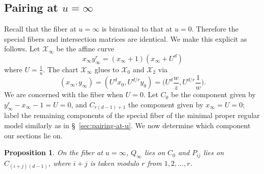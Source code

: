\documentclass[reqno]{amsart}
\newtheorem{proposition}[thm]{Proposition}
\theoremstyle{definition}
\theoremstyle{remark}
\def\XX{\mathcal{X}}
\newcommand{\sxi}{\mathcal{X}_\infty}
\begin{document}


\subsection{Pairing at $u=\infty$}
\label{sec:pairing-at-u=infty}

Recall that the fiber at $u=\infty$ is birational to that at $u=0$. Therefore the special fibers and intersection matrices are identical. We make this explicit as follows. Let $\sxi$ be the affine curve
  \[
  x_\infty y_\infty^r = (x_\infty + 1)(x_\infty + {U^d})
  \]
  where $U = \frac{1}{u}$. The chart $\sxi$ glues to $\XX_0$ and $\XX_2$ via 
  \[
  (x_\infty, y_\infty) = (U^d x_0, U^{d/r} y_0) = \bigg(U^d \frac{w}{z}, U^{d/r} \frac{1}{w}\bigg).
  \]
  We are concerned with the fiber when $U = 0$. Let $C_0$ be the component given by $y_\infty^r - x_\infty - 1 = U = 0$, and $C_{r(d-1)+1}$ the component given by $x_\infty = U = 0$; label the remaining components of the special fiber of the minimal proper regular model similarly as in \S~\ref{sec:pairing-at-u}. We now determine which component our sections lie on.
\begin{proposition}
  On the fiber at $u=\infty$, $Q_\infty$ lies on $C_0$ and $P_{ij}$ lies on $C_{(i+j)(d-1)}$, where $i+j$ is taken modulo $r$ from $1, 2, \dots, r$. 
\end{proposition}
\end{document}
